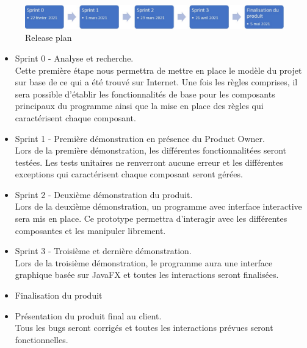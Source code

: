 \begin{figure}[h]
	\centering
	\includegraphics[width=\textwidth]{plan.jpg}
	\caption{Release plan}
	\label{fig:plan}
\end{figure}
\begin{itemize}
	\item Sprint 0 - Analyse et recherche.\\
	Cette première étape nous permettra de mettre en place le modèle du projet sur base de ce qui a été trouvé sur Internet. Une fois  les règles comprises, il sera possible d'établir les fonctionnalités de base pour les composants principaux du programme ainsi que la mise en place des règles qui caractérisent chaque composant.
	\item Sprint 1 - Première démonstration en présence du Product Owner.\\
	Lors de la première démonstration, les différentes fonctionnalitées seront testées. Les tests unitaires ne renverront aucune erreur et les différentes exceptions qui caractérisent chaque composant seront gérées.
	\item Sprint 2 - Deuxième démonstration du produit.\\
	Lors de la deuxième démonstration, un programme avec interface interactive sera mis en place. Ce prototype permettra d'interagir avec les différentes composantes et les manipuler librement.
	\item Sprint 3 - Troisième et dernière démonstration.\\
	Lors de la troisième démonstration, le programme aura une interface graphique basée sur JavaFX et toutes les interactions seront finalisées.
	\item Finalisation du produit  
	\item Présentation du produit final au client.\\
	Tous les bugs seront corrigés et toutes les interactions prévues seront fonctionnelles.
\end{itemize}
